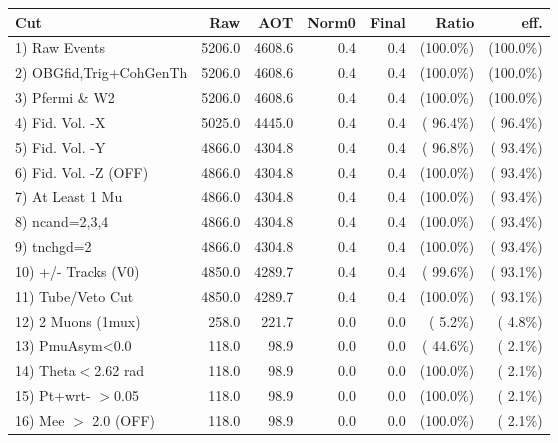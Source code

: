  \begin{table}[h!]\centering
 \begin{tabular}{||l||r|r|r|r|r|r||}
 \hline
 \hline
 Cut & Raw & AOT & Norm0 & Final & Ratio & eff.       \\
 \hline
  1) Raw Events           &       5206.0 &       4608.6 &          0.4 &          0.4 & (100.0\%) & (100.0\%) \\
  2) OBGfid,Trig+CohGenTh &       5206.0 &       4608.6 &          0.4 &          0.4 & (100.0\%) & (100.0\%) \\
  3) Pfermi \& W2         &       5206.0 &       4608.6 &          0.4 &          0.4 & (100.0\%) & (100.0\%) \\
  4) Fid. Vol. -X         &       5025.0 &       4445.0 &          0.4 &          0.4 & ( 96.4\%) & ( 96.4\%) \\
  5) Fid. Vol. -Y         &       4866.0 &       4304.8 &          0.4 &          0.4 & ( 96.8\%) & ( 93.4\%) \\
  6) Fid. Vol. -Z (OFF)   &       4866.0 &       4304.8 &          0.4 &          0.4 & (100.0\%) & ( 93.4\%) \\
  7) At Least 1 Mu        &       4866.0 &       4304.8 &          0.4 &          0.4 & (100.0\%) & ( 93.4\%) \\
  8) ncand=2,3,4          &       4866.0 &       4304.8 &          0.4 &          0.4 & (100.0\%) & ( 93.4\%) \\
  9) tnchgd=2             &       4866.0 &       4304.8 &          0.4 &          0.4 & (100.0\%) & ( 93.4\%) \\
 10) +/- Tracks (V0)      &       4850.0 &       4289.7 &          0.4 &          0.4 & ( 99.6\%) & ( 93.1\%) \\
 11) Tube/Veto Cut        &       4850.0 &       4289.7 &          0.4 &          0.4 & (100.0\%) & ( 93.1\%) \\
 12) 2 Muons (1mux)       &        258.0 &        221.7 &          0.0 &          0.0 & (  5.2\%) & (  4.8\%) \\
 13) PmuAsym<0.0          &        118.0 &         98.9 &          0.0 &          0.0 & ( 44.6\%) & (  2.1\%) \\
 14) Theta$<$2.62 rad     &        118.0 &         98.9 &          0.0 &          0.0 & (100.0\%) & (  2.1\%) \\
 15) Pt+wrt- $>$0.05      &        118.0 &         98.9 &          0.0 &          0.0 & (100.0\%) & (  2.1\%) \\
 16) Mee $>$ 2.0  (OFF)   &        118.0 &         98.9 &          0.0 &          0.0 & (100.0\%) & (  2.1\%) \\

\end{tabular}
\end{table}
